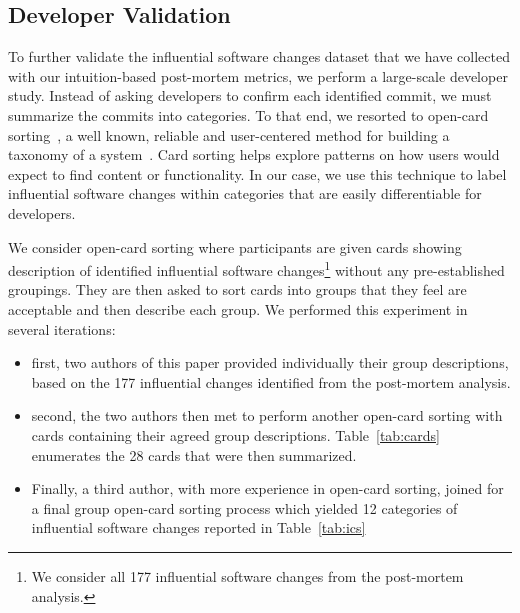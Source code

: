

\subsection{Developer Validation}
\label{subsec.opencard}

To further validate the influential software changes dataset that we have
collected with our intuition-based post-mortem metrics, we perform a large-scale developer study. Instead of asking developers to confirm each identified
commit, we must summarize the commits into categories. To that end, we
resorted to open-card sorting~\cite{Nielsen95}, a well known, reliable and
user-centered method for building a taxonomy of a system~\cite{boxesandarrows}.
Card sorting helps explore patterns on how users would expect to find content
or functionality. In our case, we use this technique to label influential
software changes within categories that are easily differentiable for
developers.

We consider open-card sorting where participants are given cards showing
description of identified influential software changes\footnote{We consider
all 177 influential software changes from the post-mortem analysis.} without
any pre-established groupings. They are then asked to sort cards into groups
that they feel are acceptable and then describe each group. We performed this
experiment in several iterations: 
\begin{itemize}
	\item first, two authors of this paper provided individually their group descriptions, based on the 177 influential changes identified from the post-mortem analysis.
	\item  second, the two authors then met to perform another open-card sorting with cards containing their agreed group descriptions. Table~\ref{tab:cards} enumerates the 28 cards that were then summarized.
	\item Finally, a third author, with more experience in open-card sorting, joined for a final group open-card sorting process which yielded 12 categories of influential software changes reported in Table~\ref{tab:ics}
\end{itemize}
 
